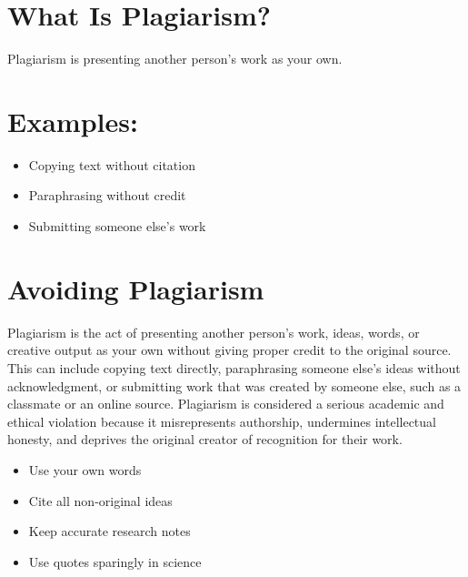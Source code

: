 \documentclass[
  letterpaper,
  DIV=11,
  numbers=noendperiod]{scrreprt}
\begin{document}
\section*{\texorpdfstring{\textbf{What Is
Plagiarism?}}{What Is Plagiarism?}}\label{what-is-plagiarism}


Plagiarism is presenting another person's work as your own.

\section*{\texorpdfstring{\textbf{Examples:}}{Examples:}}\label{examples}


\begin{itemize}
\item
  Copying text without citation
\item
  Paraphrasing without credit
\item
  Submitting someone else's work
\end{itemize}

\section*{\texorpdfstring{\textbf{Avoiding
Plagiarism}}{Avoiding Plagiarism}}\label{avoiding-plagiarism}


Plagiarism is the act of presenting another person's work, ideas, words,
or creative output as your own without giving proper credit to the
original source. This can include copying text directly, paraphrasing
someone else's ideas without acknowledgment, or submitting work that was
created by someone else, such as a classmate or an online source.
Plagiarism is considered a serious academic and ethical violation
because it misrepresents authorship, undermines intellectual honesty,
and deprives the original creator of recognition for their work.

\begin{itemize}
\item
  Use your own words
\item
  Cite all non-original ideas
\item
  Keep accurate research notes
\item
  Use quotes sparingly in science
\end{itemize}
\end{document}
